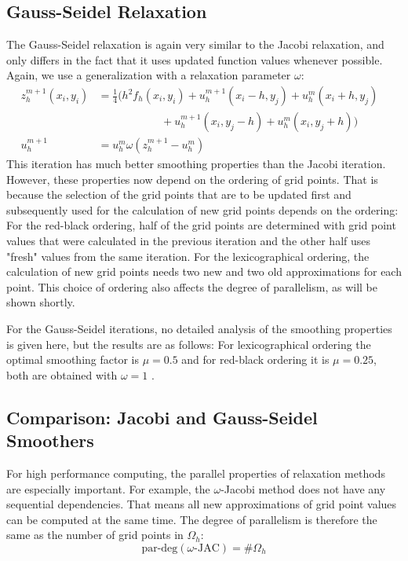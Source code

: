 \subsection{Gauss-Seidel Relaxation}
The Gauss-Seidel relaxation is again very similar to the Jacobi relaxation, and only differs in the fact that it uses updated function values whenever possible. Again, we use a generalization with a relaxation parameter $\omega$:
\begin{align}
z_h^{m+1}(x_i, y_i)&= \frac{1}{4} \Big ( h^2 f_h(x_i, y_i) + u_h^{m+1}(x_i-h, y_j) + u_h^m(x_i+h, y_j) \nonumber \\
                  &~~~~~~~~~~~~~~~~~~~~~~~~~~+ u_h^{m+1}(x_i, y_j-h) + u_h^m(x_i,y_j+h) \Big ) \\
        u_h^{m+1} &= u_h^m \omega (z_h^{m+1} - u_h^m) & \nonumber
\end{align}
This iteration has much better smoothing properties than the Jacobi iteration. However, these properties now depend on the ordering of grid points. That is because the selection of the grid points that are to be updated first and subsequently used for the calculation of new grid points depends on the ordering: For the red-black ordering, half of the grid points are determined with grid point values that were calculated in the previous iteration and the other half uses "fresh" values from the same iteration. For the lexicographical ordering, the calculation of new grid points needs two new and two old approximations for each point. This choice of ordering also affects the degree of parallelism, as will be shown shortly. 

For the Gauss-Seidel iterations, no detailed analysis of the smoothing properties is given here, but the results are as follows: For lexicographical ordering the optimal smoothing factor is $\mu = 0.5$  and  for red-black ordering it is $\mu = 0.25$, both are obtained with $\omega = 1$ \cite{Trottenberg:2000:MUL:374106}. 


\subsection{Comparison: Jacobi and Gauss-Seidel Smoothers}

For high performance computing, the parallel properties of relaxation methods are especially important. For example, the $\omega$-Jacobi method does not have any sequential dependencies. That means all new approximations of grid point values can be computed at the same time. The degree of parallelism is therefore the same as the number of grid points in $\Omega_h$:
\begin{equation}
\text{par-deg}(\omega\textrm{-JAC}) = \#\Omega_h
\end{equation}

